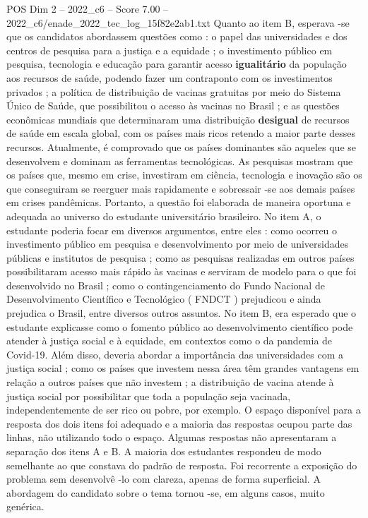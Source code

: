 \begin{textsample}{POS Dim 2 – 2022\_c6 – Score 7.00 – 2022\_c6/enade\_2022\_tec\_log\_15f82e2ab1.txt}
Quanto ao item B, esperava -se que os candidatos abordassem questões como : o papel das universidades e dos centros de pesquisa para a justiça e a equidade ; o investimento público em pesquisa, tecnologia e educação para garantir acesso \textbf{igualitário} da população aos recursos de saúde, podendo fazer um contraponto com os investimentos privados ; a política de distribuição de vacinas gratuitas por meio do Sistema Único de Saúde, que possibilitou o acesso às vacinas no Brasil ; e as questões econômicas mundiais que determinaram uma distribuição \textbf{desigual} de recursos de saúde em escala global, com os países mais ricos retendo a maior parte desses recursos.
Atualmente, é comprovado que os países dominantes são aqueles que se desenvolvem e dominam as ferramentas tecnológicas.
As pesquisas mostram que os países que, mesmo em crise, investiram em ciência, tecnologia e inovação são os que conseguiram se reerguer mais rapidamente e sobressair -se aos demais países em crises pandêmicas.
Portanto, a questão foi elaborada de maneira oportuna e adequada ao universo do estudante universitário brasileiro.
No item A, o estudante poderia focar em diversos argumentos, entre eles : como ocorreu o investimento público em pesquisa e desenvolvimento por meio de universidades públicas e institutos de pesquisa ; como as pesquisas realizadas em outros países possibilitaram acesso mais rápido às vacinas e serviram de modelo para o que foi desenvolvido no Brasil ; como o contingenciamento do Fundo Nacional de Desenvolvimento Científico e Tecnológico ( FNDCT ) prejudicou e ainda prejudica o Brasil, entre diversos outros assuntos.
No item B, era esperado que o estudante explicasse como o fomento público ao desenvolvimento científico pode atender à justiça social e à equidade, em contextos como o da pandemia de Covid-19.
Além disso, deveria abordar a importância das universidades com a justiça social ; como os países que investem nessa área têm grandes vantagens em relação a outros países que não investem ; a distribuição de vacina atende à justiça social por possibilitar que toda a população seja vacinada, independentemente de ser rico ou pobre, por exemplo.
O espaço disponível para a resposta dos dois itens foi adequado e a maioria das respostas ocupou parte das linhas, não utilizando todo o espaço.
Algumas respostas não apresentaram a separação dos itens A e B.
A maioria dos estudantes respondeu de modo semelhante ao que constava do padrão de resposta.
Foi recorrente a exposição do problema sem desenvolvê -lo com clareza, apenas de forma superficial.
A abordagem do candidato sobre o tema tornou -se, em alguns casos, muito genérica.

\end{textsample}
